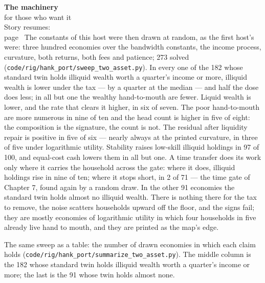 \begin{machinery}{\textbf{The machinery}\\for those who want it\\[3pt]{\color{muted}Story resumes:\\page~\pageref{ch15}}}
The constants of this host were then drawn at random, as the first
host's were: three hundred economies over the bandwidth constants, the
income process, curvature, both returns, both fees and patience; 273
solved (\texttt{code/\allowbreak{}rig/\allowbreak{}hank\_\allowbreak{}port/\allowbreak{}sweep\_\allowbreak{}two\_\allowbreak{}asset.\allowbreak{}py}). In every one of the
182 whose standard twin holds illiquid wealth worth a quarter's income
or more, illiquid wealth is lower under the tax --- by a quarter at the
median --- and half the dose does less; in all but one the wealthy
hand-to-mouth are fewer. Liquid wealth is lower, and the rate that
clears it higher, in six of seven. The poor hand-to-mouth are more
numerous in nine of ten and the head count is higher in five of
eight: the composition is the signature, the count is not. The
residual after liquidity repair is positive in five of six --- nearly
always at the printed curvature, in three of five under logarithmic
utility. Stability raises low-skill illiquid holdings in 97 of 100,
and equal-cost cash lowers them in all but one. A time transfer does
its work only where it carries the household across the gate: where
it does, illiquid holdings rise in nine of ten; where it stops short,
in 2 of 71 --- the time gate of Chapter 7, found again by a random
draw. In the other 91 economies the standard twin holds almost no
illiquid wealth. There is nothing there for the tax to remove, the
noise scatters households upward off the floor, and the signs fail;
they are mostly economies of logarithmic utility in which four
households in five already live hand to mouth, and they are printed
as the map's edge.

\tableneed{106pt}

The same sweep as a table: the number of drawn economies in which each claim holds (\texttt{code/\allowbreak{}rig/\allowbreak{}hank\_\allowbreak{}port/\allowbreak{}summarize\_\allowbreak{}two\_\allowbreak{}asset.\allowbreak{}py}). The middle column is the 182 whose standard twin holds illiquid wealth worth a quarter's income or more; the last is the 91 whose twin holds almost none.


\end{machinery}
